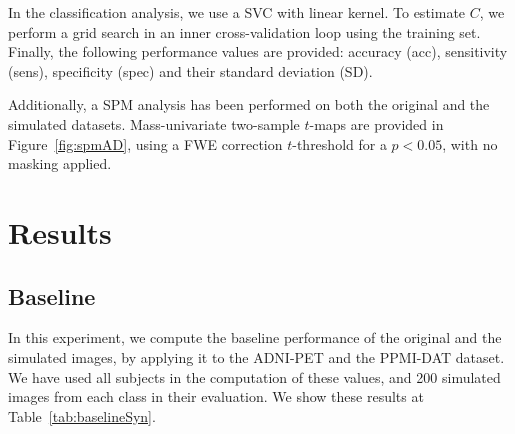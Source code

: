 In the classification analysis, we use a \ac{SVC} with linear kernel. To estimate $C$, we perform a grid search in an inner cross-validation loop using the training set. Finally, the following performance values are provided: accuracy (acc), sensitivity (sens), specificity (spec) and their standard deviation (SD). 

Additionally, a \ac{SPM} analysis \cite{spm_book} has been performed on both the original and the simulated datasets. Mass-univariate two-sample $t$-maps are provided in Figure~\ref{fig:spmAD}, using a \ac{FWE} correction $t$-threshold for a $p<0.05$, with no masking applied. 

\section{Results}
\label{sec:resultsSynthesis}
\subsection{Baseline}
In this experiment, we compute the baseline performance of the original and the simulated images, by applying it to the ADNI-PET and the PPMI-DAT dataset. We have used all subjects in the computation of these values, and 200 simulated images from each class in their evaluation. We show these results at Table~\ref{tab:baselineSyn}. 

